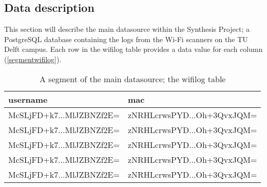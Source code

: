 \subsection{Data description}\label{datadescription}
This section will describe the main datasource within the Synthesis Project; a PostgreSQL database containing the logs from the Wi-Fi scanners on the TU Delft campus. Each row in the wifilog table provides a data value for each column (\autoref{segmentwifilog}).

\begin{table}[H]
\centering
\captionsetup{justification=centering}
\caption{A segment of the main datasource; the wifilog table}
\label{segmentwifilog}
\begin{tabular}{ll}
\hline
\textbf{username}        & \textbf{mac}               \\ \hline
McSLjFD+k7...MlJZBNZf2E= & zNRHLcrwsPYD...Oh+3QvxJQM= \\
McSLjFD+k7...MlJZBNZf2E= & zNRHLcrwsPYD...Oh+3QvxJQM= \\
McSLjFD+k7...MlJZBNZf2E= & zNRHLcrwsPYD...Oh+3QvxJQM= \\
McSLjFD+k7...MlJZBNZf2E= & zNRHLcrwsPYD...Oh+3QvxJQM= \\
McSLjFD+k7...MlJZBNZf2E= & zNRHLcrwsPYD...Oh+3QvxJQM= \\ \hline
\end{tabular}
\end{table}

